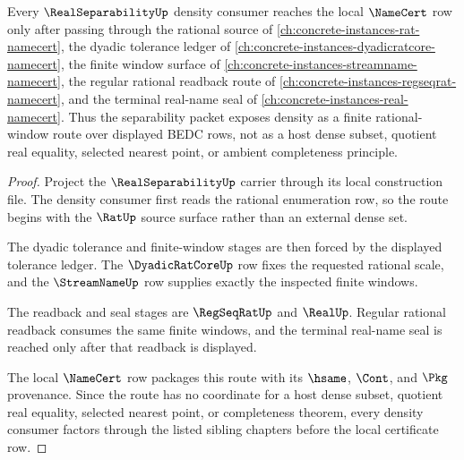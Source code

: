 \begin{theorem}
\label{thm:real-separability-dependency-route}
Every $\RealSeparabilityUp$ density consumer reaches the local $\NameCert$ row only after passing through the rational source of \autoref{ch:concrete-instances-rat-namecert}, the dyadic tolerance ledger of \autoref{ch:concrete-instances-dyadicratcore-namecert}, the finite window surface of \autoref{ch:concrete-instances-streamname-namecert}, the regular rational readback route of \autoref{ch:concrete-instances-regseqrat-namecert}, and the terminal real-name seal of \autoref{ch:concrete-instances-real-namecert}. Thus the separability packet exposes density as a finite rational-window route over displayed BEDC rows, not as a host dense subset, quotient real equality, selected nearest point, or ambient completeness principle.
\end{theorem}
\begin{proof}
Project the $\RealSeparabilityUp$ carrier through its local construction file. The density consumer first reads the rational enumeration row, so the route begins with the $\RatUp$ source surface rather than an external dense set.

The dyadic tolerance and finite-window stages are then forced by the displayed tolerance ledger. The $\DyadicRatCoreUp$ row fixes the requested rational scale, and the $\StreamNameUp$ row supplies exactly the inspected finite windows.

The readback and seal stages are $\RegSeqRatUp$ and $\RealUp$. Regular rational readback consumes the same finite windows, and the terminal real-name seal is reached only after that readback is displayed.

The local $\NameCert$ row packages this route with its $\hsame$, $\Cont$, and $\Pkg$ provenance. Since the route has no coordinate for a host dense subset, quotient real equality, selected nearest point, or completeness theorem, every density consumer factors through the listed sibling chapters before the local certificate row.
\end{proof}
